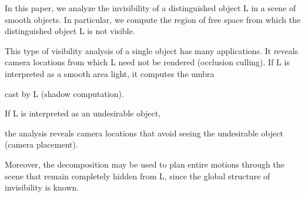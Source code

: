 \documentclass[9pt,twocolumn]{article}
\newif\ifJournal
\newif\ifComment
\begin{document}
In this paper, we analyze the invisibility of a distinguished object L 
in a scene of smooth objects.
In particular, we compute the region of free space 
from which the distinguished object L is not visible.
\ifJournal
  Space is decomposed into regions that see all of L, regions that see part of L,
  and regions that see none of L.
\else
\fi
This type of visibility analysis of a single object has many applications.
It reveals camera locations from which L need not be rendered (occlusion culling).
If L is interpreted as a smooth area light, it computes the umbra
\ifJournal
and penumbra
\fi
cast by L (shadow computation).
\ifJournal
If L is interpreted as an area light and 
the umbra is computed with respect to the permanent objects in the scene
(e.g., furniture or buildings),
other objects that move across the scene (e.g., people or cars) will move into
and out of the precomputed umbra, indicating how they should be lit.
\fi
If L is interpreted as an undesirable object, 
\ifJournal
such as sound crew's equipment,
\fi
the analysis reveals camera locations that avoid seeing the undesirable object
(camera placement).
\ifJournal
  or safe locations that are blocked from a radiation source.
\fi
\ifJournal
  If L is an object of focus, this decomposition may be used to plan movements
  through the scene that maintain complete visibility of the object, since the
  global structure of visibility is known.
\else
Moreover, the decomposition may be used to plan entire motions through the scene that 
remain completely hidden from L, since the global structure of invisibility is known.
\fi

\ifComment
  Good because it uses complete visibility, which is more subtle than partial visibility,
  and it doesn't compete with the speed of rendering as does 1.
  Planning a path as in the next application is a good generalization too.
  Probably better than the umbral application since it emphasizes the general
  visibility interpretation rather than the object as light specialization.}
\fi
\end{document}
